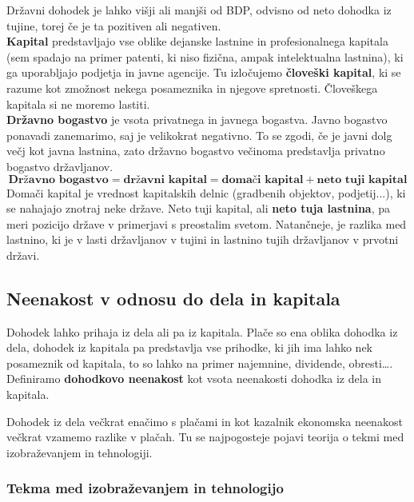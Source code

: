\documentclass[a4paper,12 pt]{article}
\begin{document}
Državni dohodek je lahko višji ali manjši od BDP, odvisno od neto dohodka iz tujine, torej če je ta pozitiven ali negativen.
\\

\textbf{Kapital} predstavljajo vse oblike dejanske lastnine in profesionalnega kapitala (sem spadajo na primer patenti, ki niso fizična, ampak intelektualna lastnina), ki ga uporabljajo podjetja in javne agencije. Tu izločujemo \textbf{človeški kapital}, ki se razume kot zmožnost nekega posameznika in njegove spretnosti. Človeškega kapitala si ne moremo lastiti.
\\

\textbf{Državno bogastvo} je vsota privatnega in javnega bogastva. Javno bogastvo ponavadi zanemarimo, saj je velikokrat negativno. To se zgodi, če je javni dolg večj kot javna lastnina, zato državno bogastvo večinoma predstavlja privatno bogastvo državljanov.
$$
\textbf{Državno bogastvo}=\textbf{državni kapital}=\textbf{domači kapital}+\textbf{neto tuji kapital}
$$
Domači kapital je vrednost kapitalskih delnic (gradbenih objektov, podjetij...), ki se nahajajo znotraj neke države. Neto tuji kapital, ali \textbf{neto tuja lastnina}, pa meri pozicijo države v primerjavi s preostalim svetom. Natančneje, je razlika med lastnino, ki je v lasti državljanov v tujini in lastnino tujih državljanov v prvotni državi.
\newpage

\subsection[Neenakost v odnosu do dela in kapitala]{Neenakost v odnosu do dela in kapitala}

Dohodek lahko prihaja iz dela ali pa iz kapitala. Plače so ena oblika dohodka iz dela, dohodek iz kapitala pa predstavlja vse prihodke, ki jih ima lahko nek posameznik od kapitala, to so lahko na primer najemnine, dividende, obresti\dots. Definiramo \textbf{dohodkovo neenakost} kot vsota neenakosti dohodka iz dela in kapitala.

Dohodek iz dela večkrat enačimo s plačami in kot kazalnik ekonomska neenakost večkrat vzamemo razlike v plačah. Tu se najpogosteje pojavi teorija o tekmi med izobraževanjem in tehnologiji.

\subsubsection[Tekma med izobraževanjem in tehnologijo]{Tekma med izobraževanjem in tehnologijo}
\end{document}
